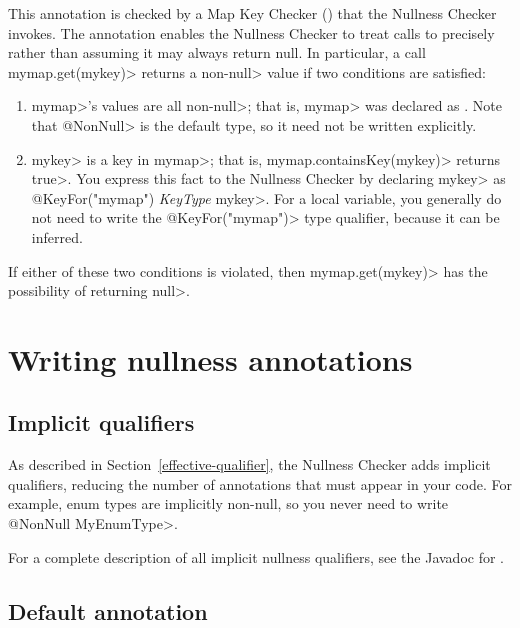 This annotation is checked by a Map Key Checker
() that the Nullness Checker
invokes.  The  annotation enables
the Nullness Checker to treat calls to
precisely rather than assuming it may always return null.  In particular,
a call \<mymap.get(mykey)> returns a non-\<null> value if two conditions
are satisfied:
\begin{enumerate}
\item \<mymap>'s values are all non-\<null>; that is, \<mymap> was
  declared as .  Note
  that \<@NonNull> is the default type, so it need not be written explicitly.
\item \<mykey> is a key in \<mymap>; that is, \<mymap.containsKey(mykey)>
  returns \<true>.  You express this fact to the Nullness Checker by
  declaring \<mykey> as \<@KeyFor("mymap") \emph{KeyType} mykey>.  For a
  local variable, you generally do not need to write the
  \<@KeyFor("mymap")> type qualifier, because it can be inferred.
\end{enumerate}
\noindent
If either of these two conditions is violated, then \<mymap.get(mykey)> has
the possibility of returning \<null>.

\section{Writing nullness annotations\label{writing-nullness-annotations}}

\subsection{Implicit qualifiers\label{nullness-implicit-qualifiers}}

As described in Section~\ref{effective-qualifier}, the Nullness Checker
adds implicit qualifiers, reducing the number of annotations that must
appear in your code.
For example, enum types are implicitly non-null, so you never need to write
\<@NonNull MyEnumType>.

For a complete description of all implicit nullness qualifiers, see the
Javadoc for .



\subsection{Default annotation\label{null-defaults}}

